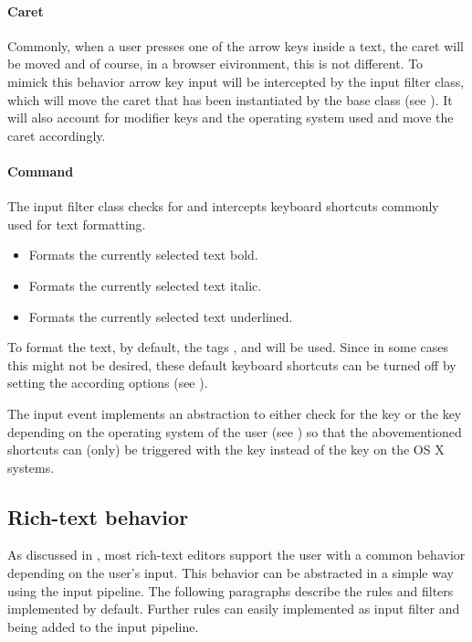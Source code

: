 \paragraph{Caret} Commonly, when a user presses one of the arrow keys inside a text, the caret will be moved and of course, in a browser eivironment, this is not different. To mimick this behavior arrow key input will be intercepted by the  input filter class, which will move the caret that has been instantiated by the  base class (see ). It will also account for modifier keys and the operating system used and move the caret accordingly.


\paragraph{Command} The  input filter class checks for and intercepts keyboard shortcuts commonly used for text formatting. 

\begin{itemize}
\item {} Formats the currently selected text bold.
\item {} Formats the currently selected text italic. 
\item {} Formats the currently selected text underlined.
\end{itemize}

To format the text, by default, the tags ,  and  will be used. Since in some cases this might not be desired, these default keyboard shortcuts can be turned off by setting the according options (see ).

The input event implements an abstraction to either check for the  key or the  key depending on the operating system of the user (see ) so that the abovementioned shortcuts can (only) be triggered with the  key instead of the  key on the OS X systems.


\subsection{Rich-text behavior}

As discussed in , most rich-text editors support the user with a common behavior depending on the user's input. This behavior can be abstracted in a simple way using the input pipeline. The following paragraphs describe the rules and filters implemented by default. Further rules can easily implemented as input filter and being added to the input pipeline.

